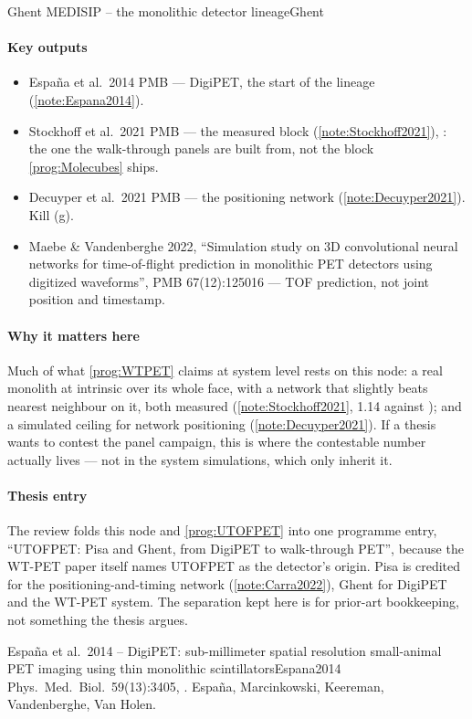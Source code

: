 \begin{programnote}{Ghent MEDISIP -- the monolithic detector lineage}{Ghent}
\paragraph{Key outputs}
\begin{itemize}
	\item Espa\~na et al.\ 2014 PMB --- DigiPET, the start of the lineage
		(\ref{note:Espana2014}).
	\item Stockhoff et al.\ 2021 PMB --- the measured block
		(\ref{note:Stockhoff2021}), : the one the
		walk-through panels are built from, not the 
		block \ref{prog:Molecubes} ships.
	\item Decuyper et al.\ 2021 PMB --- the positioning network
		(\ref{note:Decuyper2021}). Kill (g).
	\item Maebe \& Vandenberghe 2022, ``Simulation study on 3D convolutional
		neural networks for time-of-flight prediction in monolithic PET
		detectors using digitized waveforms'', PMB 67(12):125016 --- TOF
		prediction, not joint position and timestamp.
\end{itemize}

\paragraph{Why it matters here}
Much of what \ref{prog:WTPET} claims at system level rests on this node: a
real monolith at  intrinsic over its whole face, with a network that
slightly beats nearest neighbour on it, both measured
(\ref{note:Stockhoff2021}, 1.14 against ); and a simulated ceiling for
network positioning (\ref{note:Decuyper2021}). If a thesis wants to contest the panel campaign, this is
where the contestable number actually lives --- not in the system simulations,
which only inherit it.

\paragraph{Thesis entry}
The review folds this node and \ref{prog:UTOFPET} into one programme entry,
``UTOFPET: Pisa and Ghent, from DigiPET to walk-through PET'', because the
WT-PET paper itself names UTOFPET as the detector's origin. Pisa is credited
for the positioning-and-timing network (\ref{note:Carra2022}), Ghent for DigiPET
and the WT-PET system. The separation kept here is for prior-art bookkeeping,
not something the thesis argues.

\begin{papernote}{Espa\~na et al.\ 2014 -- DigiPET: sub-millimeter spatial resolution small-animal PET imaging using thin monolithic scintillators}{Espana2014}
Phys.\ Med.\ Biol.\ 59(13):3405, . Espa\~na,
Marcinkowski, Keereman, Vandenberghe, Van Holen.


\end{papernote}
\end{programnote}
